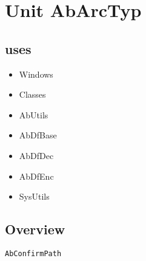 \documentclass{report}
\begin{document}
\label{toc}\tableofcontents
\newpage
\newlength{\tmplength}
\chapter{Unit AbArcTyp}
\label{AbArcTyp}
\section{uses}
\begin{itemize}
\item \begin{ttfamily}Windows\end{ttfamily}\item \begin{ttfamily}Classes\end{ttfamily}\item \begin{ttfamily}AbUtils\end{ttfamily}\item \begin{ttfamily}AbDfBase\end{ttfamily}\item \begin{ttfamily}AbDfDec\end{ttfamily}\item \begin{ttfamily}AbDfEnc\end{ttfamily}\item \begin{ttfamily}SysUtils\end{ttfamily}\end{itemize}
\section{Overview}
\begin{description}
\item[\texttt{\begin{ttfamily}TAbArchiveItem\end{ttfamily} Class}]
\item[\texttt{\begin{ttfamily}TAbArchiveList\end{ttfamily} Class}]
\item[\texttt{\begin{ttfamily}TAbArchiveStreamHelper\end{ttfamily} Class}]
\item[\texttt{\begin{ttfamily}TAbArchive\end{ttfamily} Class}]
\end{description}
\begin{description}
\item[\texttt{AbConfirmPath}]
\end{description}
\end{document}
